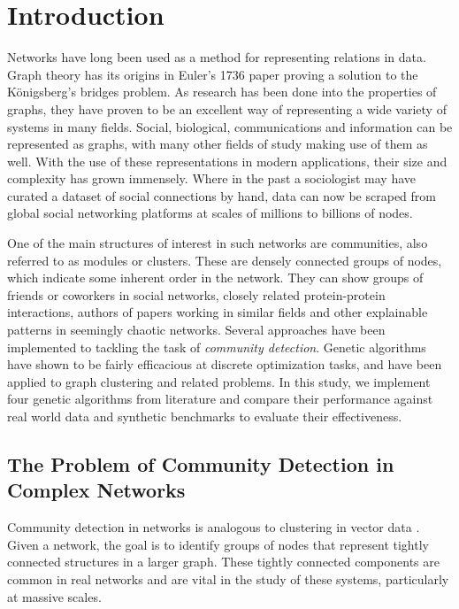 \chapter{Introduction}
\label{ch:intro:introduction}
Networks have long been used as a method for representing relations in data. Graph theory has its origins in Euler's 1736 paper proving a solution to the K\"{o}nigsberg's bridges problem. As research has been done into the properties of graphs, they have proven to be an excellent way of representing a wide variety of systems in many fields. Social, biological, communications and information can be represented as graphs, with many other fields of study making use of them as well. With the use of these representations in modern applications, their size and complexity has grown immensely. Where in the past a sociologist may have curated a dataset of social connections by hand, data can now be scraped from global social networking platforms at scales of millions to billions of nodes. 

One of the main structures of interest in such networks are communities, also referred to as modules or clusters. These are densely connected groups of nodes, which indicate some inherent order in the network. They can show groups of friends or coworkers in social networks, closely related protein-protein interactions, authors of papers working in similar fields and other explainable patterns in seemingly chaotic networks. Several approaches have been implemented to tackling the task of \textit{community detection}. Genetic algorithms have shown to be fairly efficacious at discrete optimization tasks, and have been applied to graph clustering and related problems. In this study, we implement four genetic algorithms from literature and compare their performance against real world data and synthetic benchmarks to evaluate their effectiveness.


\pagebreak

\section{The Problem of Community Detection in Complex Networks}
Community detection in networks is analogous to clustering in vector data \cite{Peel2016}. Given a network, the goal is to identify groups of nodes that represent tightly connected structures in a larger graph. These tightly connected components are common in real networks and are vital in the study of these systems, particularly at massive scales.

